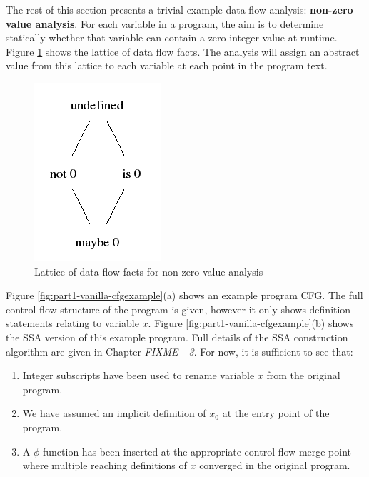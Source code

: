 
The rest of this section presents a trivial example
data flow analysis: 
\textbf{non-zero value analysis}. 
For each variable in a program, the aim is to determine statically whether
that variable can contain a zero integer value at runtime.
Figure \ref{fig:part1-vanilla-nonzerolattice} shows the lattice of 
data flow facts. The analysis will assign an abstract value from this lattice
to each variable at each point in the program text.

\begin{figure}
\begin{center}
\includegraphics[scale=0.6]{zero_lattice.png}
\end{center}
\caption{\label{fig:part1-vanilla-nonzerolattice}Lattice of data flow facts
  for non-zero value analysis}
\end{figure}

Figure \ref{fig:part1-vanilla-cfgexample}(a) shows an example program CFG.
The full control flow structure of the program is given, however
it only shows definition
statements relating to variable $x$.
Figure \ref{fig:part1-vanilla-cfgexample}(b) shows the SSA version of this
example program. Full details of the SSA construction algorithm are given in 
Chapter \emph{FIXME - 3}. For now, it is sufficient to see that:
\begin{enumerate}
\item Integer subscripts have been used to rename
variable $x$ from the original program.
\item We have assumed an implicit definition of $x_0$ at the entry point of
  the program.
\item A $\phi$-function has been
inserted at the appropriate control-flow merge point where multiple reaching
definitions of $x$ converged in the original program.
\end{enumerate}


